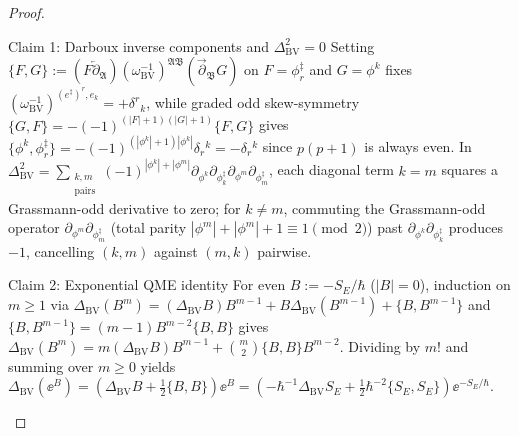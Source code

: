 \begin{proof}\leavevmode
\begin{proofpart}{Claim 1: Darboux inverse components and $\Delta_{\mathrm{BV}}^2 = 0$}
Setting $\{F, G\} := (F\overleftarrow{\partial}_{\mathfrak{A}})(\omega_{\mathrm{BV}}^{-1})^{\mathfrak{A}\mathfrak{B}}(\overrightarrow{\partial}_{\mathfrak{B}}G)$ on $F = \phi^\ddagger_r$ and $G = \phi^k$ fixes $(\omega_{\mathrm{BV}}^{-1})^{(e^\ddagger)^r, e_k} = +\delta^r{}_k$, while graded odd skew-symmetry $\{G, F\} = -(-1)^{(|F|+1)(|G|+1)}\{F, G\}$ gives $\{\phi^k, \phi^\ddagger_r\} = -(-1)^{(|\phi^k|+1)|\phi^k|}\delta_r{}^k = -\delta_r{}^k$ since $p(p+1)$ is always even. In $\Delta_{\mathrm{BV}}^2 = \sum_{\substack{k,m\\\mathrm{pairs}}}(-1)^{|\phi^k|+|\phi^m|}\partial_{\phi^k}\partial_{\phi^\ddagger_k}\partial_{\phi^m}\partial_{\phi^\ddagger_m}$, each diagonal term $k = m$ squares a Grassmann-odd derivative to zero; for $k \neq m$, commuting the Grassmann-odd operator $\partial_{\phi^m}\partial_{\phi^\ddagger_m}$ (total parity $|\phi^m| + |\phi^m| + 1 \equiv 1 \pmod 2$) past $\partial_{\phi^k}\partial_{\phi^\ddagger_k}$ produces $-1$, cancelling $(k,m)$ against $(m,k)$ pairwise.
\end{proofpart}
\begin{proofpart}{Claim 2: Exponential QME identity}
For even $B := -S_E/\hbar$ ($|B| = 0$), induction on $m \ge 1$ via $\Delta_{\mathrm{BV}}(B^m) = (\Delta_{\mathrm{BV}}B)B^{m-1} + B\Delta_{\mathrm{BV}}(B^{m-1}) + \{B, B^{m-1}\}$ and $\{B, B^{m-1}\} = (m-1)B^{m-2}\{B,B\}$ gives $\Delta_{\mathrm{BV}}(B^m) = m(\Delta_{\mathrm{BV}}B)B^{m-1} + \binom{m}{2}\{B,B\}B^{m-2}$. Dividing by $m!$ and summing over $m \ge 0$ yields $\Delta_{\mathrm{BV}}(\ee^B) = (\Delta_{\mathrm{BV}}B + \frac{1}{2}\{B,B\})\ee^B = (-\hbar^{-1}\Delta_{\mathrm{BV}}S_E + \frac{1}{2}\hbar^{-2}\{S_E,S_E\})\ee^{-S_E/\hbar}$.
\end{proofpart}
\end{proof}

